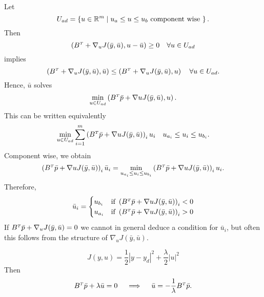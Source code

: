 \documentclass[../skript.tex]{subfiles}
\begin{document}
\begin{example}
Let
\[
U_{ad} = \left\{ u \in \mathbb{R}^m \mathrel{}\middle|\mathrel{} u_a \leq u \leq u_b \text{ component wise } \right\}.
\]
Then
\[
	\left( B^\tp + \nabla_u J(\bar{y}, \bar{u}), u - \bar{u} \right) \geq 0 \quad \forall u \in U_{ad}
\]
implies
\[
	\left( B^\tp + \nabla_u J(\bar{y}, \bar{u}), \bar{u} \right) \leq \left( B^\tp + \nabla_u J(\bar{y}, \bar{u}), u \right) \quad \forall u \in U_{ad}.
\]
Hence, $\bar{u}$ solves
\[
	\min_{u \in U_{ad}} \left( B^\tp \bar{p} + \nabla u J(\bar{y}, \bar{u}), u \right).
\]
This can be written equivalently
\[
	\min_{u \in U_{ad}} \sum_{i=1}^m \left( B^\tp \bar{p} + \nabla u J(\bar{y}, \bar{u}) \right)_i u_i \quad u_{a_i} \leq u_i \leq u_{b_i}.
\]
Component wise, we obtain
\[
	\left( B^\tp \bar{p} + \nabla u J(\bar{y}, \bar{u}) \right)_i \bar{u}_i = \min_{u_{a_i} \leq u_i \leq u_{b_i}} \left( B^\tp \bar{p} + \nabla u J(\bar{y}, \bar{u}) \right)_i u_i.
\]
Therefore,
\[
	\bar{u}_i = \begin{cases}
	u_{b_i} & \text{if } \left( B^\tp \bar{p} + \nabla u J(\bar{y}, \bar{u}) \right)_i < 0 \\
	u_{a_i} & \text{if } \left( B^\tp \bar{p} + \nabla u J(\bar{y}, \bar{u}) \right)_i > 0
	\end{cases}
\]
If $B^\tp \bar{p} + \nabla_u J(\bar{y}, \bar{u}) = 0$ we cannot in general deduce a condition for $\bar{u}_i$, but often this follows from the structure of $\nabla_u J(\bar{y}, \bar{u})$.
\begin{example}
\[
	J(y, u) = \frac{1}{2} |y -y_d|^2 + \frac{\lambda}{2} |u|^2
\]
Then
\[
	B^\tp \bar{p} + \lambda \bar{u} = 0 \quad \implies \quad \bar{u} = -\frac{1}{\lambda} B^\tp \bar{p}.
\]
\end{example}
\end{example}
\end{document}
